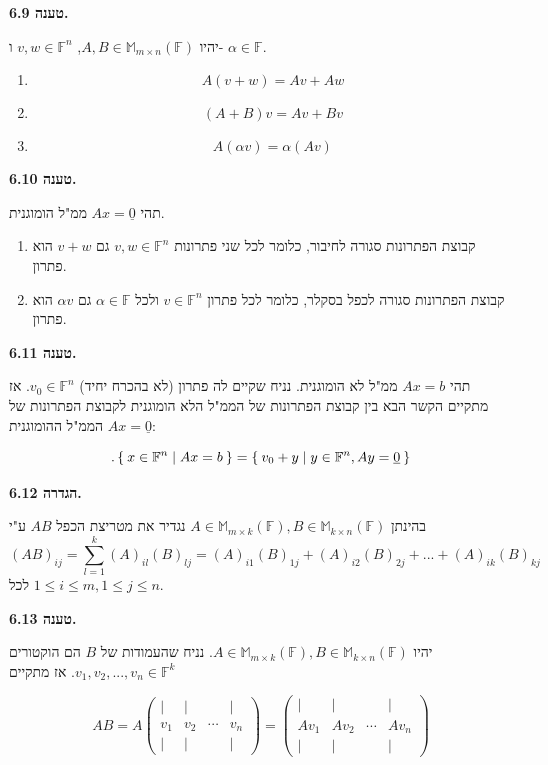\documentclass[12pt]{report}
\theoremstyle{plain}
\theoremstyle{definition}
\newcommand{\F}{\mathbb{F}}
\newcommand{\M}{\mathbb{M}}
\newcommand{\0}{\mathbf{0}}
\begin{document}
\noindent\textbf{טענה 6.9.}

יהיו
$A,B\in\M_{m\times n}(\F)$,
$v,w\in\F^n$
ו-
$\alpha\in\F$.
\begin{enumerate}[label=\alph*.]
\item
$$
A(v+w)=Av+Aw
$$


\item 
$$
(A+B)v=Av+Bv
$$


\item 
$$
A(\alpha v)=\alpha(Av)
$$


\end{enumerate}
\bigskip
\bigskip

\noindent\textbf{טענה 6.10.}

תהי
$Ax=\underline{0}$
ממ"ל הומוגנית.
\begin{enumerate}[label=\alph*.]
\item
קבוצת הפתרונות סגורה לחיבור, כלומר לכל שני פתרונות
$v,w\in\F^n$
גם
$v+w$
הוא פתרון.


\item
קבוצת הפתרונות סגורה לכפל בסקלר, כלומר לכל פתרון
$v\in\F^n$
ולכל
$\alpha\in\F$
גם
$\alpha v$
הוא פתרון.


\end{enumerate}
\bigskip
\bigskip

\noindent\textbf{טענה 6.11.}

תהי
$Ax=b$
ממ"ל לא הומוגנית. נניח שקיים לה פתרון (לא בהכרח יחיד)
$v_0\in\F^n$.
אז מתקיים הקשר הבא בין קבוצת הפתרונות של הממ"ל הלא הומוגנית לקבוצת הפתרונות של הממ"ל ההומוגנית
$Ax=\underline{0}$:

$$
.\Set{x\in\F^n|Ax=b}=\Set{v_0+y|y\in\F^n,Ay=\underline{0}}
$$
\bigskip
\bigskip

\noindent\textbf{הגדרה 6.12.}

בהינתן
$A\in\M_{m\times k}(\F),B\in\M_{k\times n}(\F)$
נגדיר את מטריצת הכפל
$AB$
ע"י
$$
(AB)_{ij}=\sum_{l=1}^k (A)_{il}(B)_{lj}=(A)_{i1}(B)_{1j}+(A)_{i2}(B)_{2j}+...+(A)_{ik}(B)_{kj}
$$
לכל
$1\leq i\leq m, 1\leq j\leq n$.
\bigskip
\bigskip

\noindent\textbf{טענה 6.13.}

יהיו
$A\in\M_{m\times k}(\F), B\in\M_{k\times n}(\F)$.
נניח שהעמודות של
$B$
הם הוקטורים
$v_1,v_2,...,v_n\in\F^k$.
אז מתקיים

$$
AB=A\begin{pmatrix}
| & | & & | \\
v_1 & v_2 & \cdots & v_n \\
| & | & & |
\end{pmatrix}=\begin{pmatrix}
| & | & & | \\
Av_1 & Av_2 & \cdots & Av_n \\
| & | & & |
\end{pmatrix}
$$
\end{document}
